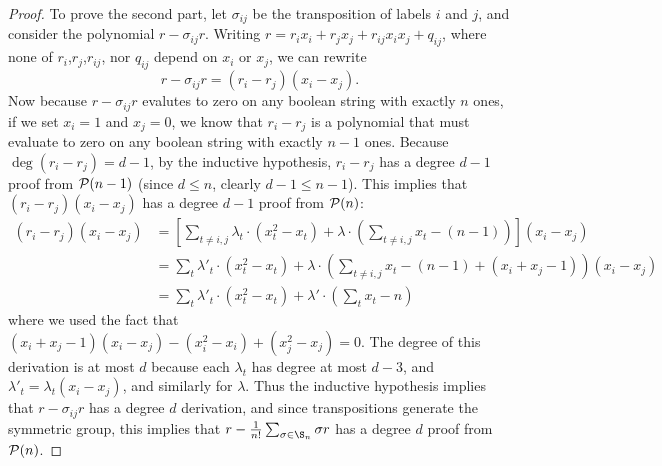 \begin{proof}
To prove the second part, let $\sigma_{ij}$ be the transposition of labels $i$ and $j$, and consider the polynomial $r - \sigma_{ij}r$. Writing $r = r_ix_i + r_jx_j + r_{ij}x_ix_j + q_{ij}$, where none of $r_i$,$r_j$,$r_{ij}$, nor $q_{ij}$ depend on $x_i$ or $x_j$, we can rewrite
\[r - \sigma_{ij}r = (r_i - r_j)(x_i - x_j).\]
Now because $r - \sigma_{ij}r$ evalutes to zero on any boolean string with exactly $n$ ones, if we set $x_i = 1$ and $x_j = 0$, we know that $r_i - r_j$ is a polynomial that must evaluate to zero on any boolean string with exactly $n-1$ ones. Because $\deg (r_i - r_j) = d-1$, by the inductive hypothesis, $r_i - r_j$ has a degree $d-1$ proof from $\mathcal P(n-1)$ (since $d \leq n$, clearly $d-1 \leq n-1$). This implies that $(r_i - r_j)(x_i - x_j)$ has a degree $d-1$ proof from $\mathcal P(n)$:
\begin{align*}
(r_i - r_j)(x_i - x_j) &= \left[\sum_{t \neq i,j} \lambda_t\cdot (x_t^2 - x_t) + \lambda \cdot \left(\sum_{t \neq i,j} x_t - (n-1)\right)\right](x_i - x_j) \\
&= \sum_{t} \lambda'_t \cdot (x_t^2 - x_t) + \lambda \cdot \left(\sum_{t \neq i,j} x_t - (n-1) + (x_i + x_j - 1)\right)(x_i - x_j)\\
&= \sum_t \lambda'_t \cdot (x_t^2 - x_t) +\lambda' \cdot \left(\sum_t x_t - n\right)
\end{align*}
where we used the fact that $(x_i + x_j - 1)(x_i - x_j) - (x_i^2 - x_i) + (x_j^2 - x_j) = 0$. The degree of this derivation is at most $d$ because each $\lambda_t$ has degree at most $d-3$, and $\lambda'_t = \lambda_t(x_i - x_j)$, and similarly for $\lambda$. Thus the inductive hypothesis implies that $r - \sigma_{ij}r$ has a degree $d$ derivation, and since transpositions generate the symmetric group, this implies that $r - \frac{1}{n!}\sum_{\sigma \in \S_n} \sigma r$ has a degree $d$ proof from $\mathcal P(n)$.
\end{proof}

